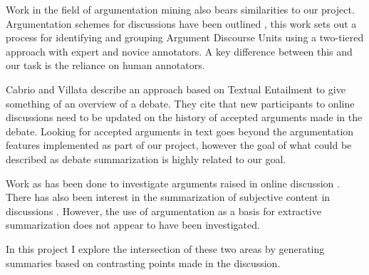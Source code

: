     Work in the field of argumentation mining also bears similarities to our project. Argumentation schemes for discussions have been outlined \cite{ghosh2014analyzing}, this work sets out a process for identifying and grouping Argument Discourse Units using a two-tiered approach with expert and novice annotators. A key difference between this and our task is the reliance on human annotators.

    Cabrio and Villata \cite{cabrio2012combining} describe an approach based on Textual Entailment to give something of an overview of a debate. They cite that new participants to online discussions need to be updated on the history of accepted arguments made in the debate. Looking for accepted arguments in text goes beyond the argumentation features implemented as part of our project, however the goal of what could be described as debate summarization is highly related to our goal.

    Work as has been done to investigate arguments raised in online discussion \cite{boltuzic2015identifying,cabrio2012combining,ghosh2014analyzing}. There has also been interest in the summarization of subjective content in discussions \cite{hu2004mining,lloret2009towa,galley2004identifying}. However, the use of argumentation as a basis for extractive summarization does not appear to have been investigated.

    In this project I explore the intersection of these two areas by generating summaries based on contrasting points made in the discussion.

